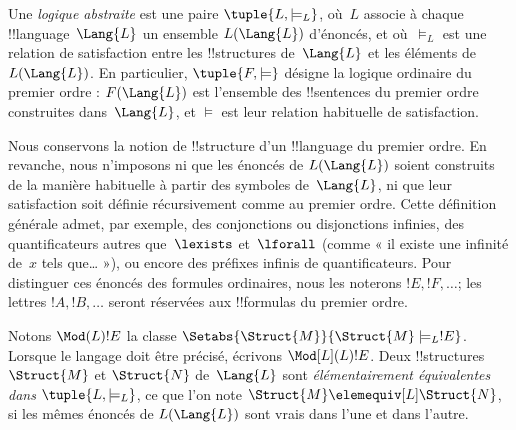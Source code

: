 \documentclass[../../../include/open-logic-section]{subfiles}
\begin{document}

\begin{defn}
Une \emph{logique abstraite} est une paire
$\tuple{L,\models_L}$, où~$L$ associe
à chaque !!{language}~$\Lang{L}$ un
ensemble $L(\Lang{L})$ d'énoncés,
et où~$\models_L$ est une relation
de satisfaction entre les
!!{structure}s de~$\Lang{L}$ et les
éléments de~$L(\Lang{L})$.
En particulier, $\tuple{F,\models}$
désigne la logique ordinaire du premier
ordre : $F(\Lang{L})$ est l'ensemble
des !!{sentence}s du premier ordre
construites dans~$\Lang{L}$, et
$\models$ est leur relation habituelle
de satisfaction.
\end{defn}

Nous conservons la notion de
!!{structure} d'un !!{language} du
premier ordre. En revanche, nous
n'imposons ni que les énoncés de
$L(\Lang{L})$ soient construits
de la manière habituelle à partir
des symboles de~$\Lang{L}$, ni
que leur satisfaction soit définie
récursivement comme au premier ordre.
Cette définition générale admet,
par exemple, des conjonctions ou
disjonctions infinies, des
quantificateurs autres que~$\lexists$
et~$\lforall$ (comme « il existe
une infinité de~$x$ tels que… »),
ou encore des préfixes infinis de
quantificateurs. Pour distinguer
ces énoncés des formules ordinaires,
nous les noterons $!E,!F,\dots$;
les lettres $!A,!B,\dots$ seront
réservées aux !!{formula}s du
premier ordre.

\begin{defn}
Notons $\Mod(L){!E}$ la classe
$\Setabs{\Struct{M}}{\Struct{M}\models_L !E}$.
Lorsque le langage doit être précisé,
écrivons $\Mod[L](L){!E}$.
Deux !!{structure}s $\Struct{M}$ et
$\Struct{N}$ de~$\Lang{L}$ sont
\emph{élémentairement équivalentes
dans} $\tuple{L,\models_L}$,
ce que l'on note
$\Struct{M}\elemequiv[L]\Struct{N}$,
si les mêmes énoncés de
$L(\Lang{L})$ sont vrais dans
l'une et dans l'autre.
\end{defn}
\end{document}
